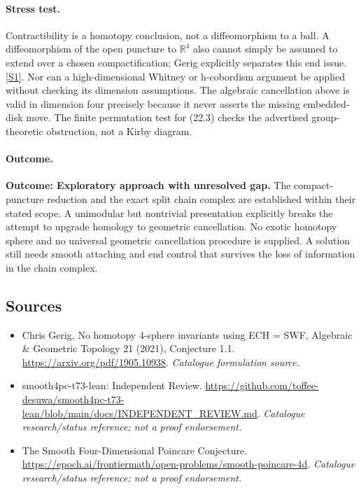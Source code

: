 \documentclass[11pt,a4paper]{article}
\newcommand{\R}{\mathbb{R}}
\newcommand{\sref}[2]{\hyperlink{source:#1:#2}{[S#2]}}
\begin{document}
\paragraph{Stress test.}
Contractibility is a homotopy conclusion, not a diffeomorphism to a ball.
A diffeomorphism of the open puncture to $\R^4$ also cannot simply be
assumed to extend over a chosen compactification; Gerig explicitly
separates this end issue. \sref{18}{1}.
Nor can a high-dimensional Whitney or h-cobordism argument be applied
without checking its dimension assumptions. The algebraic cancellation
above is valid in dimension four precisely because it never asserts the
missing embedded-disk move. The finite permutation test for (22.3)
checks the advertised group-theoretic obstruction, not a Kirby diagram.

\paragraph{Outcome.}
\textbf{Outcome: Exploratory approach with unresolved gap.}
The compact-puncture reduction and the exact split chain complex are
established within their stated scope. A unimodular but nontrivial
presentation explicitly breaks the attempt to upgrade homology to
geometric cancellation. No exotic homotopy sphere and no universal
geometric cancellation procedure is supplied. A solution still needs
smooth attaching and end control that survives the loss of information
in the chain complex.
\subsection{Sources}
\begin{itemize}\raggedright
\item[\textnormal{[S1]}]\hypertarget{source:18:1}{} Chris Gerig, No homotopy 4-sphere invariants using ECH = SWF, Algebraic \& Geometric Topology 21 (2021), Conjecture 1.1.
\url{https://arxiv.org/pdf/1905.10938}.
{\small\textit{Catalogue formulation source.}}
\item[\textnormal{[S2]}]\hypertarget{source:18:2}{} smooth4pc-t73-lean: Independent Review.
\url{https://github.com/toffee-desuwa/smooth4pc-t73-lean/blob/main/docs/INDEPENDENT_REVIEW.md}.
{\small\textit{Catalogue research/status reference; not a proof endorsement.}}
\item[\textnormal{[S3]}]\hypertarget{source:18:3}{} The Smooth Four-Dimensional Poincare Conjecture.
\url{https://epoch.ai/frontiermath/open-problems/smooth-poincare-4d}.
{\small\textit{Catalogue research/status reference; not a proof endorsement.}}
\end{itemize}

\end{document}
